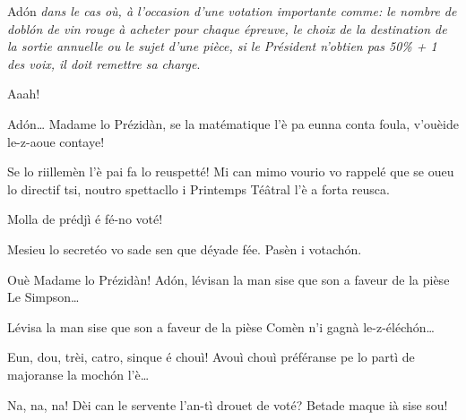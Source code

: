 \begin{drama}
\Secreteospeaks Ad\'on \og\textit{dans le cas où, à l’occasion d’une votation importante comme: le nombre de \og dobl\'on \fg de vin rouge à acheter pour chaque épreuve, le choix de la destination de la sortie annuelle ou le sujet d’une pièce, si le Président n’obtien pas 50\% + 1 des voix, il doit remettre sa charge}\fg.

\Sophiespeaks Aaah! 


\Jordyspeaks Ad\'on\ldots {} Madame lo Prézidàn, se la matématique l'è pa eunna conta foula, v'ouèide le-z-aoue contaye!

\Presidanspeaks {} Se lo riillemèn l'è pai fa lo reuspetté! Mi can mimo vourio vo rappelé que se oueu lo directif tsi, noutro spettacllo i Printemps Té\^atral l'è a forta reusca.

\Marcospeaks Molla de prédjì é fé-no voté!

\Presidanspeaks Mesieu lo secretéo vo sade sen que déyade fée. Pasèn i votach\'on.

\Secreteospeaks Ouè Madame lo Prézidàn! Ad\'on, lévisan la man sise que son a faveur de la pièse \og Le Simpson\fg\ldots


\Secreteospeaks Lévisa la man sise que son a faveur de la pièse \og Comèn n'i gagnà le-z-éléch\'on\fg\ldots


\Secreteospeaks Eun, dou, trèi, catro, sinque  é chouì! Avouì chouì préféranse pe lo partì de majoranse la moch\'on l’è\ldots

\Sophiespeaks {}
Na, na, na! Dèi can le servente l'an-tì drouet de
voté?  Betade maque ià sise sou!


\end{drama}
